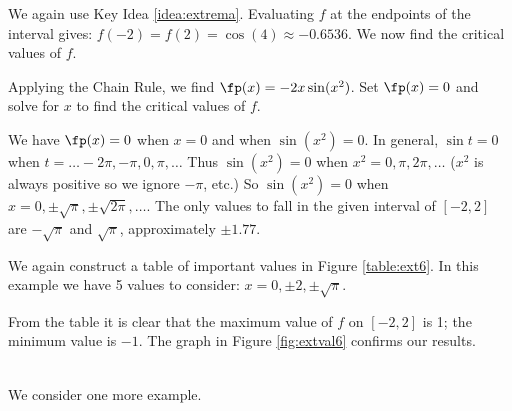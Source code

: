 {We again use Key Idea \ref{idea:extrema}. Evaluating $f$ at the endpoints of the interval gives: $f(-2) = f(2) = \cos (4) \approx -0.6536.$ We now find the critical values of $f$.

Applying the Chain Rule, we find $\fp(x) = -2x\sin (x^2)$. Set $\fp(x) = 0$ and solve for $x$ to find the critical values of $f$. 

We have $\fp(x) = 0$ when $x = 0$ and when $\sin (x^2) = 0$. In general, $\sin t = 0$ when $t = \ldots -2\pi, -\pi, 0, \pi, \ldots$ Thus $\sin (x^2) = 0$ when $x^2 = 0, \pi, 2\pi, \ldots$ ($x^2$ is always positive so we ignore $-\pi$, etc.) So $\sin (x^2)=0$ when $x= 0, \pm \sqrt{\pi}, \pm\sqrt{2\pi}, \ldots$. The only values to fall in the given interval of $[-2,2]$ are $-\sqrt{\pi}$ and $\sqrt{\pi}$, approximately $\pm 1.77$.

We again construct a table of important values in Figure \ref{table:ext6}. In this example we have 5 values to consider: $x= 0, \pm 2, \pm\sqrt{\pi}$. 


From the table it is clear that the maximum value of $f$ on $[-2,2]$ is 1; the minimum value is $-1$. The graph in Figure \ref{fig:extval6} confirms our results.
}\\

We consider one more example.\\


